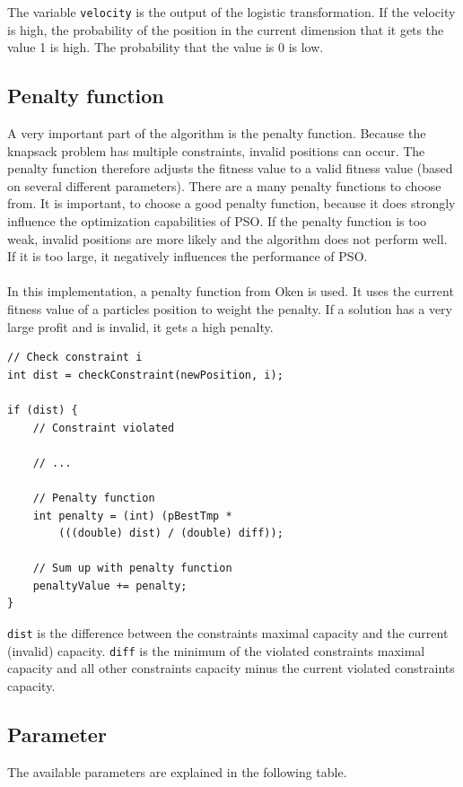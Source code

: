 \documentclass{article}
\begin{document}
The variable \lstinline{velocity} is the output of the logistic transformation. If the velocity is high, the probability of the position in the current dimension that it gets the value 1 is high. The probability that the value is 0 is low.

\subsection{Penalty function}
A very important part of the algorithm is the penalty function. Because the knapsack problem has multiple constraints, invalid positions can occur. The penalty function therefore adjusts the fitness value to a valid fitness value (based on several different parameters). There are a many penalty functions to choose from. It is important, to choose a good penalty function, because it does strongly influence the optimization capabilities of PSO. If the penalty function is too weak, invalid positions are more likely and the algorithm does not perform well. If it is too large, it negatively influences the performance of PSO.\\ \\
In this implementation, a penalty function from Oken \cite{bib-penalty} is used. It uses the current fitness value of a particles position to weight the penalty. If a solution has a very large profit and is invalid, it gets a high penalty.

\newpage

\begin{lstlisting}[caption="Solver.cpp"]
// Check constraint i
int dist = checkConstraint(newPosition, i);

if (dist) {
	// Constraint violated
	
	// ...
	
	// Penalty function
	int penalty = (int) (pBestTmp *
		(((double) dist) / (double) diff));
		
	// Sum up with penalty function
	penaltyValue += penalty;
}
\end{lstlisting}

\lstinline{dist} is the difference between the constraints maximal capacity and the current (invalid) capacity. \lstinline{diff} is the minimum of the violated constraints maximal capacity and all other constraints capacity minus the current violated constraints capacity.

\subsection{Parameter}
The available parameters are explained in the following table.\\
\end{document}
